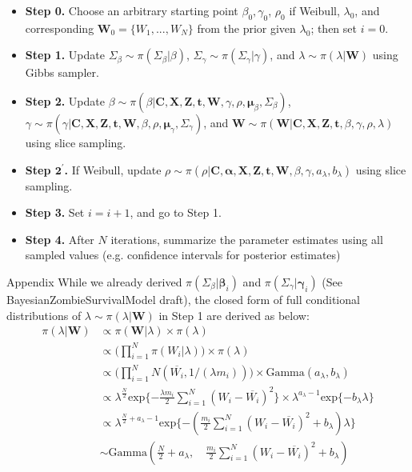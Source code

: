 \documentclass[a4paper, 12pt]{article}
\makeatletter
\renewcommand{\section}{\@startsection
	{section}    {1}    {0mm}    {-0.7\baselineskip}    {0.08\baselineskip}    {\normalfont\large\sc\center\bf}}
\makeatother
\begin{document}
\begin{itemize}
	\item[] {\textbf{Step 0.}} Choose an arbitrary starting point ${\beta}_0, {\gamma}_0$, $\rho_0$ if Weibull, $\lambda_0$, and corresponding $\mathbf{W}_0=\{W_1,...,W_N\}$ from the prior given $\lambda_0$; then set $i = 0$.
	\item[] {\textbf{Step 1.}} Update $\Sigma_{\beta} \sim \pi(\Sigma_{\beta}|{\beta})$, $\Sigma_{\gamma} \sim \pi(\Sigma_{\gamma}|{\gamma})$, and $\lambda \sim \pi(\lambda|\mathbf{W})$ using Gibbs sampler.
	\item[] {\textbf{Step 2.}} Update ${\beta}\sim \pi({\beta}|\mathbf{C}, \mathbf{X}, \mathbf{Z}, \mathbf{t}, \mathbf{W}, {\gamma}, \rho, \mathbf{\mu}_{\beta}, \Sigma_{\beta})$, ${\gamma}\sim \pi({\gamma}|\mathbf{C}, \mathbf{X}, \mathbf{Z}, \mathbf{t}, \mathbf{W}, {\beta},\rho, \mathbf{\mu}_{\gamma}, \Sigma_{\gamma})$, and $\mathbf{W}\sim \pi(\mathbf{W}|\mathbf{C}, \mathbf{X}, \mathbf{Z}, \mathbf{t}, {\beta}, \gamma, \rho, \lambda)$ using slice sampling. 
	\item[] {\textbf{Step $\mathbf{2}^\prime$.}} If Weibull, update $\rho \sim \pi(\rho|\mathbf{C}, \mathbf{\alpha}, \mathbf{X}, \mathbf{Z}, \mathbf{t}, \mathbf{W}, {\beta}, {\gamma}, a_{\lambda}, b_{\lambda})$  using slice sampling.
	\item[] {\textbf{Step 3.}} Set $i = i + 1$, and go to Step 1.
	\item[] {\textbf{Step 4.}} After $N$ iterations, summarize the parameter estimates using all sampled values (e.g. confidence intervals for posterior estimates)
\end{itemize}
\section{Appendix}
\noindent While we already derived $\pi(\Sigma_{\beta}|\mathbf{\beta}_i)$ and $\pi(\Sigma_{\gamma}|\mathbf{\gamma}_i)$ (See BayesianZombieSurvivalModel draft), the closed form of full conditional distributions of $\lambda \sim \pi(\lambda|\mathbf{W})$ in Step 1 are derived as below:
	\begin{equation*}
	\begin{aligned}
\pi(\lambda|\mathbf{W})	&\propto\pi(\mathbf{W}|\lambda)\times \pi(\lambda) \\
	&\propto \Big(\prod_{i=1}^N \pi(W_i|\lambda)\Big) \times \pi(\lambda)\\
	& \propto \Big(\prod_{i=1}^N N(\overline{W_i}, 1/(\lambda m_i))\Big) \times \mbox{Gamma}(a_{\lambda}, b_{\lambda})\\
	& \propto \lambda^{\frac{N}{2}} \mbox{exp}\{-\frac{\lambda m_i}{2}\sum_{i=1}^N (W_i - \overline{W_i})^2\} \times \lambda^{a_{\lambda}-1}\mbox{exp}\{-b_{\lambda}\lambda\}\\
	& \propto \lambda^{\frac{N}{2} + a_{\lambda}-1}\mbox{exp}\{-(\frac{ m_i}{2}\sum_{i=1}^N (W_i - \overline{W_i})^2 +b_{\lambda})\lambda\} \\
	&\sim \mbox{Gamma}(\frac{N}{2} + a_{\lambda},\quad \frac{ m_i}{2}\sum_{i=1}^N (W_i - \overline{W_i})^2 +b_{\lambda})	
	\end{aligned}
	\end{equation*} 
 
\end{document}
